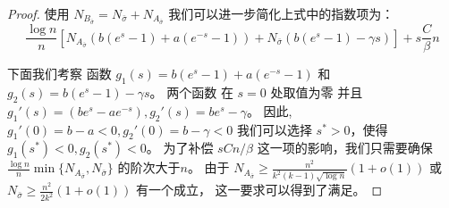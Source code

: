 \begin{proof}
    使用 $N_{B_{\bar{\sigma}}} = N_{\bar{\sigma}} + N_{A_{\bar{\sigma}}}$
    我们可以进一步简化上式中的指数项为：
    $$
    \frac{\log n}{n} [N_{A_{\bar{\sigma}}}(b(e^s -1)+ a(e^{-s} - 1)) +
    N_{\bar{\sigma}} (b(e^s - 1)-\gamma s)]  + s \frac{C}{\beta}n
    $$
    
    下面我们考察 函数 $g_1(s) = b(e^s -1)+ a(e^{-s} - 1)$
    和 $g_2(s) = b(e^s - 1)-\gamma s$。
    两个函数 在 $s=0$ 处取值为零
    并且 $g_1'(s) = (be^s - ae^{-s}), g_2'(s) = be^s -\gamma$。
    因此, $g_1'(0) = b-a<0, g_2'(0) = b - \gamma < 0$
    我们可以选择 $s^*>0$，使得 $g_1(s^*) < 0,g_2(s^*) < 0$。
    为了补偿 $sCn/\beta$ 这一项的影响，我们只需要确保
    $\frac{\log n}{n} \min\{N_{A_{\bar{\sigma}}}, N_{\bar{\sigma}}\}$ 的阶次大于$n$。
    由于   $N_{A_{\bar{\sigma}}}\geq \frac{n^2}{k^2 (k-1)\sqrt{\log n}}(1+o(1))$ 或 $N_{\bar{\sigma}} \geq \frac{n^2}{2k^2}(1+o(1))$
    有一个成立，
    这一要求可以得到了满足。
  \end{proof}

